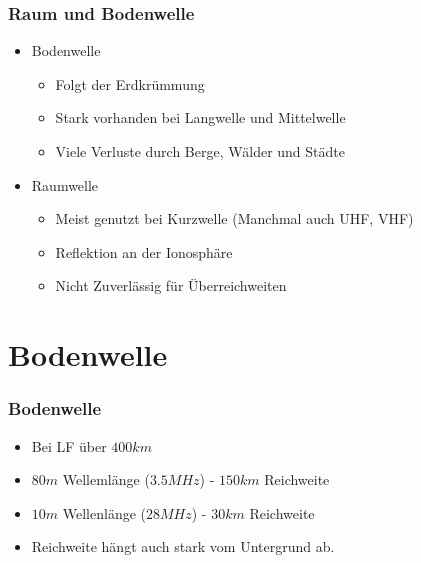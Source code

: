 \begin{frame}
    \frametitle{Raum und Bodenwelle}
	\begin{itemize}
        \item Bodenwelle
			\begin{itemize}
				\item Folgt der Erdkrümmung
       		 	\item Stark vorhanden bei Langwelle und Mittelwelle
        		\item Viele Verluste durch Berge, Wälder und Städte
    		\end{itemize}
        \item Raumwelle
			\begin{itemize}
       		 	\item Meist genutzt bei Kurzwelle (Manchmal auch UHF, VHF)
        		\item Reflektion an der Ionosphäre 
        		\item Nicht Zuverlässig für Überreichweiten
    		\end{itemize}
    \end{itemize}
\end{frame}

\section*{Bodenwelle}
\begin{frame}
    \frametitle{Bodenwelle}
	\begin{itemize}
				\item Bei LF über $400km$
       		 	\item $80m$ Wellemlänge ($3.5MHz$)  - $150km$ Reichweite
        		\item $10m$ Wellenlänge ($28MHz$) - $30km$ Reichweite
        		\item Reichweite hängt auch stark vom Untergrund ab.
    \end{itemize}
\end{frame}

